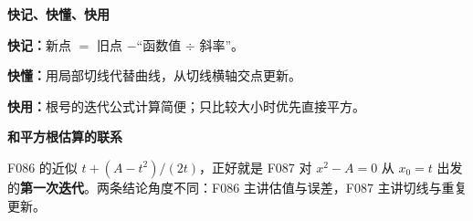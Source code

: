 \clearpage
\begin{summarybox}
\textbf{\textcolor{CSummary}{快记、快懂、快用}}
\par\medskip
\begin{center}

\end{center}
\medskip
\textbf{快记：}新点 $=$ 旧点 $-$“函数值 $\div$ 斜率”。\par\textbf{快懂：}用局部切线代替曲线，从切线横轴交点更新。\par\textbf{快用：}根号的迭代公式计算简便；只比较大小时优先直接平方。
\end{summarybox}
\clearpage
\begin{summarybox}
\textbf{\textcolor{CSummary}{和平方根估算的联系}}
\par\medskip
\begin{center}

\end{center}
\medskip
F086 的近似 $t+(A-t^2)/(2t)$，正好就是 F087 对 $x^2-A=0$ 从 $x_0=t$ 出发的\textbf{第一次迭代}。两条结论角度不同：F086 主讲估值与误差，F087 主讲切线与重复更新。
\end{summarybox}
